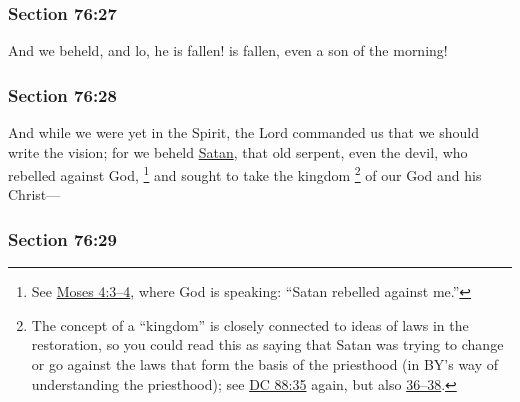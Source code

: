	\subsubsection{Section 76:27} %
		\label{DC76-27}

		And we beheld, and lo, he is fallen! is fallen, even a son of the morning!


	\subsubsection{Section 76:28} %
		\label{DC76-28}

		And while we were yet in the Spirit, the Lord commanded us that we should write the vision; for we beheld \hyperref[SATAN]{Satan}, that old serpent, even the devil, who rebelled against God,%
			\footnote{%
				See \hyperref[MOSES-4-3]{Moses 4:3--4}, where God is speaking: ``Satan rebelled against me.''
				}
		and sought to take the kingdom%
			\footnote{%
				The concept of a ``kingdom'' is closely connected to ideas of laws in the restoration, so you could read this as saying that Satan was trying to change or go against the laws that form the basis of the priesthood (in BY's way of understanding the priesthood); see \hyperref[DC88-35]{DC 88:35} again, but also \hyperref[DC88-36]{36--38}.
				}
		of our God and his Christ---


	\subsubsection{Section 76:29} %
		\label{DC76-29}

